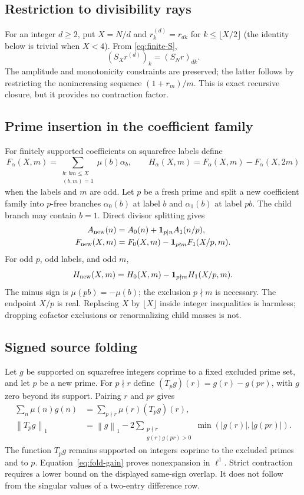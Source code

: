 \documentclass[11pt,letterpaper]{article}
\numberwithin{equation}{section}
\theoremstyle{definition}
\theoremstyle{remark}
\newcommand{\ind}{\mathbf 1}
\newcommand{\norm}[1]{\left\lVert#1\right\rVert}
\begin{document}
\subsection{Restriction to divisibility rays}
For an integer $d\ge2$, put $X=N/d$ and $r^{(d)}_k=r_{dk}$ for
$k\le\lfloor X/2\rfloor$ (the identity below is trivial when $X<4$). From \eqref{eq:finite-S},
\begin{equation}\label{eq:ray}
 (S_Xr^{(d)})_k=(S_Nr)_{dk}.
\end{equation}
The amplitude and monotonicity constraints are preserved; the latter
follows by restricting the nonincreasing sequence $(1+r_m)/m$.
This is exact recursive closure, but it provides no contraction factor.

\subsection{Prime insertion in the coefficient family}
For finitely supported coefficients on squarefree labels define
\[
 F_\alpha(X,m)=
 \sum_{\substack{b:\,bm\le X\\(b,m)=1}}\mu(b)\alpha_b,\qquad
 H_\alpha(X,m)=F_\alpha(X,m)-F_\alpha(X,2m)
\]
when the labels and $m$ are odd.
Let $p$ be a fresh prime and split a new coefficient family into
$p$-free branches $\alpha_0(b)$ at label $b$ and $\alpha_1(b)$ at label
$pb$. The child branch may contain $b=1$. Direct divisor splitting gives
\begin{align}
 A_{\rm new}(n)&=A_0(n)+\ind_{p\mid n}A_1(n/p),\label{eq:insert-A}\\
 F_{\rm new}(X,m)&=F_0(X,m)-\ind_{p\nmid m}F_1(X/p,m).\label{eq:insert-F}
\end{align}
For odd $p$, odd labels, and odd $m$,
\[
 H_{\rm new}(X,m)=H_0(X,m)-\ind_{p\nmid m}H_1(X/p,m).
\]
The minus sign is $\mu(pb)=-\mu(b)$; the exclusion $p\nmid m$ is necessary.
The endpoint $X/p$ is real. Replacing $X$ by $\lfloor X\rfloor$ inside
integer inequalities is harmless; dropping cofactor exclusions or
renormalizing child masses is not.

\subsection{Signed source folding}
Let $g$ be supported on squarefree integers coprime to a fixed excluded
prime set, and let $p$ be a new prime. For $p\nmid r$ define
$(T_pg)(r)=g(r)-g(pr)$, with $g$ zero beyond its support. Pairing $r$ and
$pr$ gives
\begin{align}
 \sum_n\mu(n)g(n)&=\sum_{p\nmid r}\mu(r)(T_pg)(r),\label{eq:fold}\\
 \norm{T_pg}_1&=\norm g_1-
 2\sum_{\substack{p\nmid r\\g(r)g(pr)>0}}
                   \min(|g(r)|,|g(pr)|).\label{eq:fold-gain}
\end{align}
The function $T_pg$ remains supported on integers coprime to the excluded
primes and to $p$.
Equation~\eqref{eq:fold-gain} proves nonexpansion in $\ell^1$.
Strict contraction requires a lower bound on the displayed same-sign
overlap. It does not follow from the singular values of a two-entry
difference row.
\end{document}
